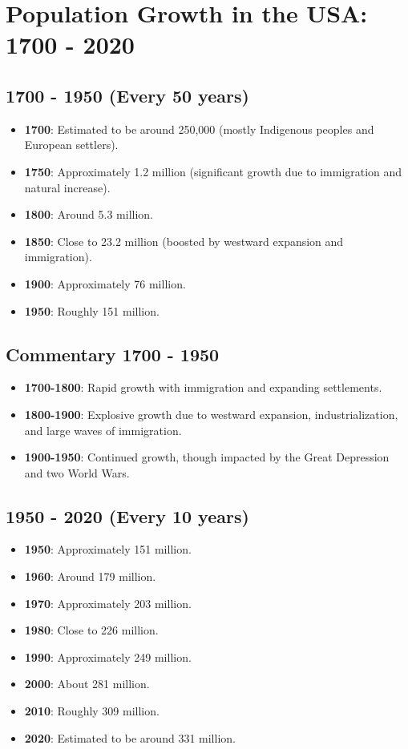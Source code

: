 \section{Population Growth in the USA: 1700 - 2020}

\subsection*{1700 - 1950 (Every 50 years)}
\begin{itemize}
    \item \textbf{1700}: Estimated to be around 250,000 (mostly Indigenous peoples and European settlers).
    \item \textbf{1750}: Approximately 1.2 million (significant growth due to immigration and natural increase).
    \item \textbf{1800}: Around 5.3 million.
    \item \textbf{1850}: Close to 23.2 million (boosted by westward expansion and immigration).
    \item \textbf{1900}: Approximately 76 million.
    \item \textbf{1950}: Roughly 151 million.
\end{itemize}

\subsection*{Commentary 1700 - 1950}
\begin{itemize}
    \item \textbf{1700-1800}: Rapid growth with immigration and expanding settlements.
    \item \textbf{1800-1900}: Explosive growth due to westward expansion, industrialization, and large waves of immigration.
    \item \textbf{1900-1950}: Continued growth, though impacted by the Great Depression and two World Wars.
\end{itemize}

\subsection*{1950 - 2020 (Every 10 years)}
\begin{itemize}
    \item \textbf{1950}: Approximately 151 million.
    \item \textbf{1960}: Around 179 million.
    \item \textbf{1970}: Approximately 203 million.
    \item \textbf{1980}: Close to 226 million.
    \item \textbf{1990}: Approximately 249 million.
    \item \textbf{2000}: About 281 million.
    \item \textbf{2010}: Roughly 309 million.
    \item \textbf{2020}: Estimated to be around 331 million.
\end{itemize}

